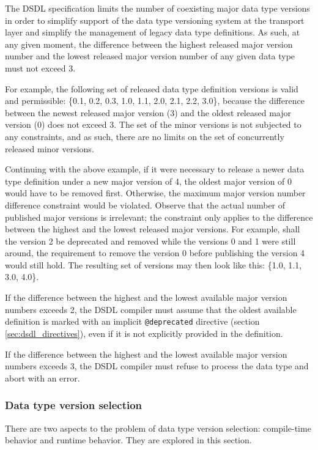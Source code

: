 The DSDL specification limits the number of coexisting major data type versions
in order to simplify support of the data type versioning system at the transport layer
and simplify the management of legacy data type definitions.
As such, at any given moment, the difference between the highest released major version number
and the lowest released major version number of any given data type must not exceed 3.

For example, the following set of released data type definition versions is valid and permissible:
\{0.1, 0.2, 0.3, 1.0, 1.1, 2.0, 2.1, 2.2, 3.0\},
because the difference between the newest released major version (3) and the oldest released major version (0)
does not exceed 3.
The set of the minor versions is not subjected to any constraints,
and as such, there are no limits on the set of concurrently released minor versions.

Continuing with the above example, if it were necessary to release a newer data type definition
under a new major version of 4, the oldest major version of 0 would have to be removed first.
Otherwise, the maximum major version number difference constraint would be violated.
Observe that the actual number of published major versions is irrelevant;
the constraint only applies to the difference between the highest and the lowest released major versions.
For example, shall the version 2 be deprecated and removed while the versions 0 and 1 were still around,
the requirement to remove the version 0 before publishing the version 4 would still hold.
The resulting set of versions may then look like this:
\{1.0, 1.1, 3.0, 4.0\}.

If the difference between the highest and the lowest available major version numbers exceeds 2,
the DSDL compiler must assume that the oldest available definition is marked with an implicit
\verb|@deprecated| directive (section \ref{sec:dsdl_directives}),
even if it is not explicitly provided in the definition.

If the difference between the highest and the lowest available major version numbers exceeds 3,
the DSDL compiler must refuse to process the data type and abort with an error.

\subsubsection{Data type version selection}

There are two aspects to the problem of data type version selection:
compile-time behavior and runtime behavior.
They are explored in this section.

